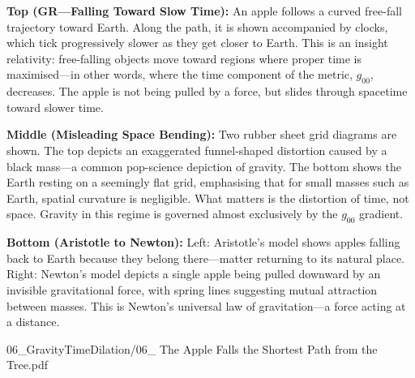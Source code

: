 \begin{SideNotePage}{
  \textbf{Top (GR—Falling Toward Slow Time):} An apple follows a curved free-fall trajectory toward Earth. Along the path, it is shown accompanied by clocks, which tick progressively slower as they get closer to Earth. This is an insight relativity: free-falling objects move toward regions where proper time is maximised—in other words, where the time component of the metric, $g_{00}$, decreases. The apple is not being pulled by a force, but slides through spacetime toward slower time. \par

  \textbf{Middle (Misleading Space Bending):} Two \QSOpen{}rubber sheet\QSClose{} grid diagrams are shown. The top depicts an exaggerated funnel-shaped distortion caused by a black mass—a common pop-science depiction of gravity. The bottom shows the Earth resting on a seemingly flat grid, emphasising that for small masses such as Earth, spatial curvature is negligible. What matters is the distortion of time, not space. Gravity in this regime is governed almost exclusively by the $g_{00}$ gradient. \par

  \textbf{Bottom (Aristotle to Newton):} Left: Aristotle's model shows apples falling back to Earth because they \QSOpen{}belong\QSClose{} there—matter returning to its natural place. Right: Newton's model depicts a single apple being pulled downward by an invisible gravitational force, with spring lines suggesting mutual attraction between masses. This is Newton's universal law of gravitation—a force acting at a distance. \par
}{06_GravityTimeDilation/06_ The Apple Falls the Shortest Path from the Tree.pdf}
\end{SideNotePage}
